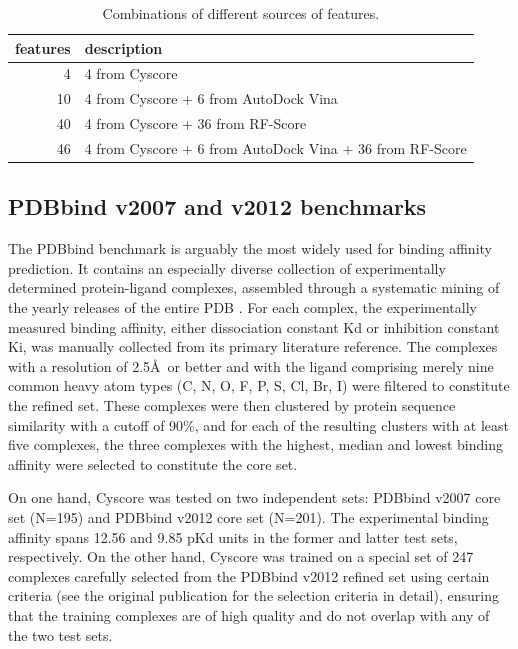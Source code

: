 \documentclass[10pt,conference,compsocconf]{IEEEtran}
\begin{document}
\begin{table}
\centering
\begin{tabular*}{\linewidth}{@{\extracolsep{\fill}}rl}
\toprule
features & description\\
\midrule
 4 & 4 from Cyscore\\
10 & 4 from Cyscore + 6 from AutoDock Vina\\
40 & 4 from Cyscore + 36 from RF-Score\\
46 & 4 from Cyscore + 6 from AutoDock Vina + 36 from RF-Score\\
\bottomrule
\end{tabular*}
\caption{Combinations of different sources of features.}
\label{tbl:features}
\end{table}

\subsection{PDBbind v2007 and v2012 benchmarks}

The PDBbind benchmark is arguably the most widely used for binding affinity prediction. It contains an especially diverse collection of experimentally determined protein-ligand complexes, assembled through a systematic mining of the yearly releases of the entire PDB \cite{540,537}. For each complex, the experimentally measured binding affinity, either dissociation constant Kd or inhibition constant Ki, was manually collected from its primary literature reference. The complexes with a resolution of 2.5\AA\ or better and with the ligand comprising merely nine common heavy atom types (C, N, O, F, P, S, Cl, Br, I) were filtered to constitute the refined set. These complexes were then clustered by protein sequence similarity with a cutoff of 90\%, and for each of the resulting clusters with at least five complexes, the three complexes with the highest, median and lowest binding affinity were selected to constitute the core set.

On one hand, Cyscore was tested on two independent sets: PDBbind v2007 core set (N=195) and PDBbind v2012 core set (N=201). The experimental binding affinity spans 12.56 and 9.85 pKd units in the former and latter test sets, respectively. On the other hand, Cyscore was trained on a special set of 247 complexes carefully selected from the PDBbind v2012 refined set using certain criteria (see the original publication \cite{1372} for the selection criteria in detail), ensuring that the training complexes are of high quality and do not overlap with any of the two test sets.
\end{document}
